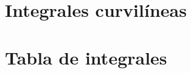 \documentclass[a4paper, 12pt, oneside, titlepage, openany]{book}
\begin{document}
\tableofcontents

\chapter{Integrales curvil\'ineas}


\appendix
\chapter{Tabla de integrales}





\listoffigures
\listoftables
\end{document}

